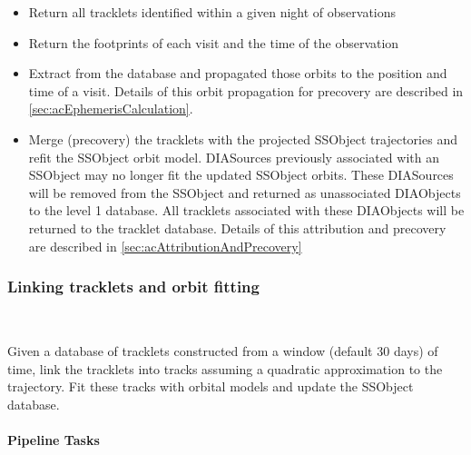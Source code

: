 \begin{itemize}
\item Return all tracklets identified within a given night of observations
\item Return the footprints of each visit and the time of the observation
\item Extract \SSObjects from the \SSObject database and propagated those orbits to the position and time of a visit. Details of this orbit propagation for precovery are described in \ref{sec:acEphemerisCalculation}. 
\item Merge (precovery) the tracklets with the projected SSObject trajectories and refit  the SSObject orbit model. DIASources previously associated with an SSObject may no longer fit the updated SSObject orbits. These DIASources will be removed from the SSObject and returned as unassociated DIAObjects to the level 1 database. All tracklets associated with these DIAObjects will be  returned to the tracklet database. Details of this attribution and precovery are described in \ref{sec:acAttributionAndPrecovery}
\end{itemize}

\subsubsection{Linking tracklets and orbit fitting}~

Given a database of tracklets constructed from a window (default 30 days) of time, link the tracklets into tracks assuming a quadratic approximation to the trajectory. Fit these tracks with orbital models and update the SSObject database.

\paragraph{Pipeline Tasks}

